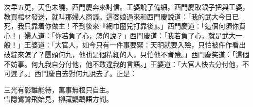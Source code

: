 次早五更，天色未曉，西門慶奔來討信。王婆說了備細。西門慶取銀子把與王婆，教買棺材發送，就叫那婦人商議。這婆娘過來和西門慶說道：「我的武大今日已死，我只靠着你做主！不到後來『網巾圈兒打靠後』。」西門慶道：「這個何須你費心！」婦人道：「你若負了心，怎的說？」西門慶道：「我若負了心，就是武大一般！」{}王婆道：「大官人，如今只有一件事要緊：天明就要入殮，只怕被仵作看出破綻來怎了？團頭何九，他也是個精細的人，只怕他不肯殮。」西門慶笑道：「這個不妨事。何九我自分付他，他不敢違我的言語。」王婆道：「大官人快去分付他，不可遲了。」西門慶自去對何九說去了。正是：

\begin{myquote} 
三光有影誰能待，萬事無根只自生。\\雪隱鷺鷥飛始見，柳藏鸚鵡語方聞。
\end{myquote} 

